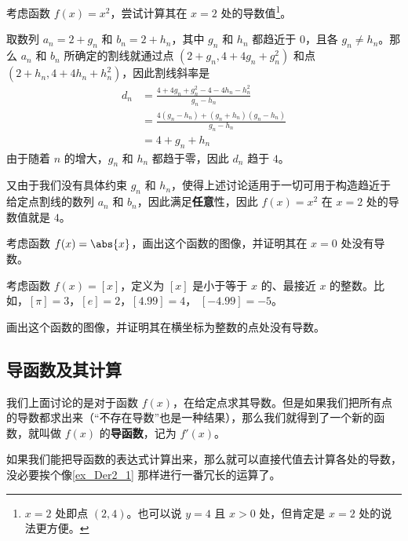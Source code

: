 \begin{example}{}\label{ex_Der2_1}
考虑函数 $f(x)=x^2$，尝试计算其在 $x=2$ 处的导数值\footnote{$x=2$ 处即点 $(2, 4)$。也可以说 $y=4$ 且 $x>0$ 处，但肯定是 $x=2$ 处的说法更方便。}。

取数列 $a_n=2+g_n$ 和 $b_n=2+h_n$，其中 $g_n$ 和 $h_n$ 都趋近于 $0$，且各 $g_n\not=h_n$。那么 $a_n$ 和 $b_n$ 所确定的割线就通过点 $(2+g_n, 4+4g_n+g_n^2)$ 和点 $(2+h_n, 4+4h_n+h_n^2)$，因此割线斜率是
\begin{equation}
\begin{aligned}
d_n&=\frac{4+4g_n+g_n^2-4-4h_n-h_n^2}{g_n-h_n}\\
&=\frac{4(g_n-h_n)+(g_n+h_n)(g_n-h_n)}{g_n-h_n}\\
&=4+g_n+h_n
\end{aligned}
\end{equation}
由于随着 $n$ 的增大，$g_n$ 和 $h_n$ 都趋于零，因此 $d_n$ 趋于 $4$。

又由于我们没有具体约束 $g_n$ 和 $h_n$，使得上述讨论适用于一切可用于构造趋近于给定点割线的数列 $a_n$ 和 $b_n$，因此满足\textbf{任意}性，因此 $f(x)=x^2$ 在 $x=2$ 处的导数值就是 $4$。
\end{example}

\begin{exercise}{}
考虑函数 $f(x)=\abs{x}$，画出这个函数的图像，并证明其在 $x=0$ 处没有导数。
\end{exercise}

\begin{exercise}{}\label{exe_Der2_1}
考虑函数 $f(x)=[x]$，定义为 $[x]$ 是小于等于 $x$ 的、最接近 $x$ 的整数。比如，$[\pi]=3$，$[e]=2$，$[4.99]=4$， $[-4.99]=-5$。

画出这个函数的图像，并证明其在横坐标为整数的点处没有导数。
\end{exercise}








\subsection{导函数及其计算}

我们上面讨论的是对于函数 $f(x)$，在给定点求其导数。但是如果我们把所有点的导数都求出来（“不存在导数”也是一种结果），那么我们就得到了一个新的函数，就叫做 $f(x)$ 的\textbf{导函数}，记为 $f'(x)$。

如果我们能把导函数的表达式计算出来，那么就可以直接代值去计算各处的导数，没必要挨个像\autoref{ex_Der2_1} 那样进行一番冗长的运算了。

